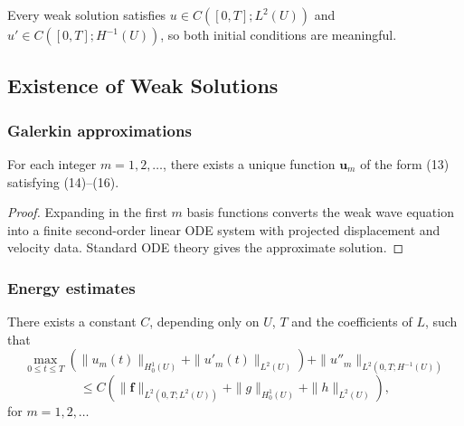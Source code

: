 \begin{remark}
\label{rem:weak-solution-hyperbolic-continuity}
Every weak solution satisfies $u\in C([0,T];L^2(U))$ and $u'\in C([0,T];H^{-1}(U))$, so both initial conditions are meaningful.
\end{remark}

\subsection{Existence of Weak Solutions}

\subsubsection{Galerkin approximations}

\begin{theorem}
\label{thm:hyperbolic-galerkin-approximate-solutions}
For each integer $m = 1, 2, \ldots$, there exists a unique function $\mathbf{u}_m$ of the form (13) satisfying (14)--(16).
\end{theorem}

\begin{proof}
\sketch Expanding in the first $m$ basis functions converts the weak wave equation into a finite second-order linear ODE system with projected displacement and velocity data. Standard ODE theory gives the approximate solution.
\end{proof}

\subsubsection{Energy estimates}

\begin{theorem}
\label{thm:hyperbolic-energy-estimates}
There exists a constant $C$, depending only on $U$, $T$ and the coefficients of $L$, such that
\[
\max_{0 \le t \le T} \left( \|u_m(t)\|_{H^1_0(U)} + \|u'_m(t)\|_{L^2(U)} \right) + \|u''_m\|_{L^2(0,T;H^{-1}(U))}
\]
\[
\le C \left( \|\mathbf{f}\|_{L^2(0,T;L^2(U))} + \|g\|_{H^1_0(U)} + \|h\|_{L^2(U)} \right),
\tag{19}
\]
for $m = 1, 2, \ldots$
\end{theorem}

